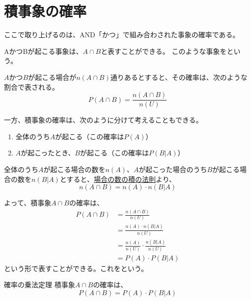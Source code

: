\documentclass[../../../topic_statistics]{subfiles}
\begin{document}
\sectionline
\section{積事象の確率}

ここで取り上げるのは、AND「かつ」で組み合わされた事象の確率である。

AかつBが起こる事象は、$A \cap B$と表すことができる。
このような事象をという。

\br

$A$かつ$B$が起こる場合が$n(A \cap B)$通りあるとすると、その確率は、次のような割合で表される。
\begin{equation*}
  P(A \cap B) = \frac{n(A \cap B)}{n(U)}
\end{equation*}

\br

一方、積事象の確率は、次のように分けて考えることもできる。

\begin{enumerate}
  \item 全体のうち$A$が起こる（この確率は$P(A)$）
  \item $A$が起こったとき、$B$が起こる（この確率は$P(B|A)$）
\end{enumerate}

全体のうち$A$が起こる場合の数を$n(A)$、$A$が起こった場合のうち$B$が起こる場合の数を$n(B|A)$とすると、\hyperref[thm:rule-of-product]{場合の数の積の法則}より、
\begin{equation*}
  n(A \cap B) = n(A) \cdot n(B|A)
\end{equation*}

よって、積事象$A \cap B$の確率は、
\begin{align*}
  P(A \cap B) & = \frac{n(A \cap B)}{n(U)}                    \\
              & = \frac{n(A) \cdot n(B|A)}{n(U)}              \\
              & = \frac{n(A)}{n(U)} \cdot \frac{n(B|A)}{n(U)} \\
              & = P(A) \cdot P(B|A)
\end{align*}
という形で表すことができる。これをという。

\begin{theorem}{確率の乗法定理}
  積事象$A \cap B$の確率は、
  \begin{equation*}
    P(A \cap B) = P(A) \cdot P(B|A)
  \end{equation*}
\end{theorem}
\end{document}
